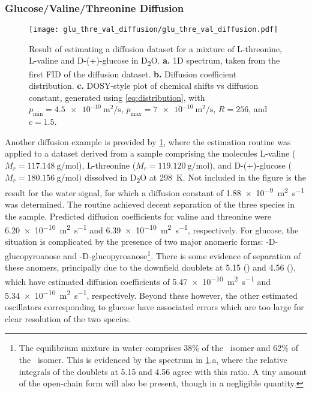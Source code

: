 \subsubsection{Glucose/Valine/Threonine Diffusion}
\begin{figure}
    \centering
    \texttt{[image: glu\_thre\_val\_diffusion/glu\_thre\_val\_diffusion.pdf]}
    \caption[
        Result of estimating a diffusion dataset for a mixture of L-threonine,
        L-valine and D-(+)-glucose.
    ]{
        Result of estimating a diffusion dataset for a mixture of L-threonine,
        L-valine and D-(+)-glucose in D\textsubscript{2}O.
        \textbf{a.} \acs{1D} spectrum, taken from the first \acs{FID} of the
        diffusion dataset.
        \textbf{b.} Diffusion coefficient distribution.
        \textbf{c.} \acs{DOSY}-style plot of chemical shifts vs diffusion
        constant, generated using \cref{eq:distribution}, with
        $p_{\text{min}} = \qty{4.5e-10}{\meter\squared\per\second}$,
        $p_{\text{max}} = \qty{7e-10}{\meter\squared\per\second}$,
        $R=256$, and $c=1.5$.
    }
    \label{fig:gluc_val_thre}
\end{figure}
Another diffusion example is provided by \cref{fig:gluc_val_thre}, where the
estimation routine was applied to a dataset derived from a sample comprising
the molecules L-valine ($M_r = \qty{117.148}{\gram\per\mole}$), L-threonine
($M_r = \qty{119.120}{\gram\per\mole}$), and D-(+)-glucose ($M_r =
\qty{180.156}{\gram\per\mole})$ dissolved in
D\textsubscript{2}O at \qty{298}{\kelvin}. Not included in the figure is the
result for the water signal, for which a diffusion constant of
\qty{1.88e-9}{\meter\squared\per\second} was determined. The routine
achieved decent separation of the three species in the sample. Predicted
diffusion coefficients for valine and threonine were
\qty{6.20e-10}{\meter\squared\per\second} and
\qty{6.39e-10}{\meter\squared\per\second}, respectively. For glucose, the situation is
complicated by the presence of two major anomeric forms:
\textalpha-D-glucopyroanose and
\textbeta-D-glucopyroanose\footnote{
    The equilibrium mixture in water comprises 38\% of the \textalpha\ isomer
    and 62\% of the \textbeta\ isomer.
    This is evidenced by the
    spectrum in \cref{fig:gluc_val_thre}.a, where the relative integrals of
    the doublets at \qty{5.15}{\partspermillion} and
    \qty{4.56}{\partspermillion} agree with this ratio.
    A tiny amount of the open-chain form will
    also be present, though in a negligible quantity.
}\cite[Chapter 3]{Davis2002}.
There is some evidence of separation of these anomers, principally due
to the downfield doublets at \qty{5.15}{\partspermillion} (\textalpha) and
\qty{4.56}{\partspermillion} (\textbeta), which have estimated diffusion
coefficients of \qty{5.47e-10}{\meter\squared\per\second}
and \qty{5.34e-10}{\meter\squared\per\second}, respectively. Beyond these
however, the other estimated oscillators corresponding to glucose have
associated errors which are too large for clear resolution of the two species.

